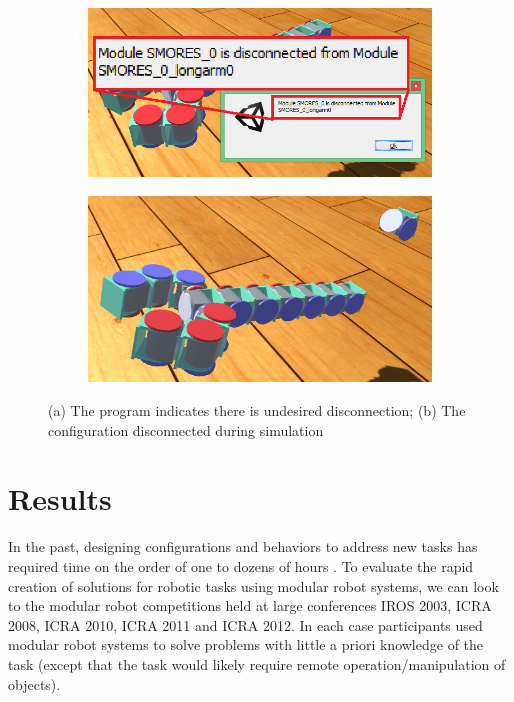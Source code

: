 \documentclass[graybox]{svmult}
\begin{document}
\begin{figure}
\begin{center}
        \begin{subfigure}[b]{0.48\columnwidth}
                \includegraphics[width=\textwidth]{images/library/unity/breakJoint.png}
                \caption{}
                \label{fig:break_joint1}
           \end{subfigure}
        \begin{subfigure}[b]{0.48\columnwidth}
                \includegraphics[width=\textwidth]{images/library/unity/breakJoint2.png}
                \caption{}
                \label{fig:break_joint2}
        \end{subfigure}
\end{center}
\caption{(a) The program indicates there is undesired disconnection; (b) The configuration disconnected during simulation}
\label{fig:break_joint}
\end{figure}


\section{Results}
In the past, designing configurations and behaviors to address new tasks has required
time on the order of one to dozens of hours \cite{sastra2011using}.  To evaluate the rapid creation of solutions for robotic tasks using modular robot systems, we can look to the modular robot competitions held at large conferences IROS 2003, ICRA 2008, ICRA 2010, ICRA 2011 and ICRA 2012. In each case participants used modular robot systems to solve problems with little a priori knowledge of the task (except that the task would likely require remote operation/manipulation of objects).
\end{document}
